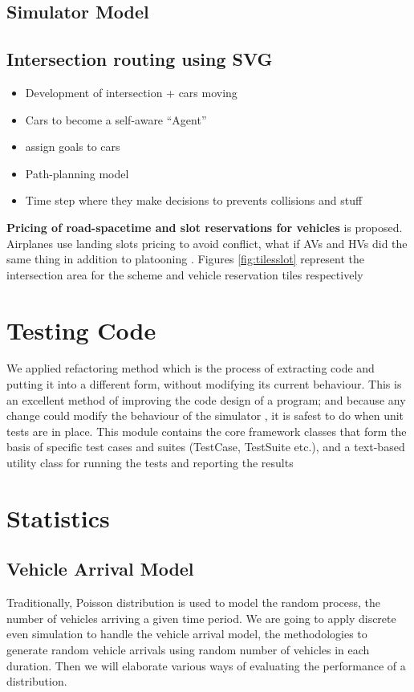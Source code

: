 \documentclass{book}
\begin{document}
\subsection{ Simulator Model}
\subsection {Intersection routing using SVG}
 \begin{itemize}
     \item Development of intersection + cars moving
     \item Cars to become a self-aware “Agent”
     \item assign goals to cars
     \item Path-planning model
     \item Time step where they make decisions to prevents collisions and stuff
 \end{itemize}


\textbf{Pricing of road-spacetime and slot reservations for vehicles} is proposed. Airplanes use landing slots pricing to avoid conflict, what if AVs and HVs did the same thing in addition to platooning \cite{gong2018cooperative, calvert2011modelling, khondaker2015variable, swaroop1994comparision, chan2012cooperative}. Figures   \ref{fig:tilesslot} represent the intersection area for the scheme and vehicle reservation tiles respectively


\section{Testing Code}
We applied refactoring method which is the process of extracting code and putting it into a different form, without modifying its current behaviour. This is an excellent method of improving the code design of a program; and because any change could modify the behaviour of the simulator , it is safest to do when unit tests are in place. This module contains the core framework classes that form the basis of
specific test cases and suites (TestCase, TestSuite etc.), and a text-based utility class for running the tests and reporting the results



\section{Statistics}

\subsection{Vehicle Arrival Model}
Traditionally, Poisson distribution is used to model the random process, the number of vehicles arriving a given time period. We are going to apply discrete even simulation to handle the vehicle arrival model, the methodologies to generate random vehicle arrivals using random number of vehicles in each duration. Then we will elaborate various ways of evaluating the performance of a distribution.
\end{document}
